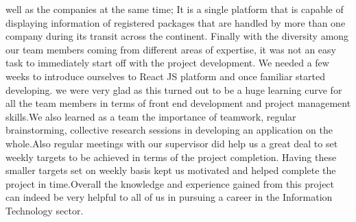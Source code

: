 well as the companies at the same time; It is a single platform that is capable of displaying information of registered packages that are handled by more than one company during its transit across the continent.
Finally with the diversity among our team members coming from different areas of expertise, it was not an easy task to immediately start off with the project development. We needed a few weeks to introduce ourselves to React JS platform and once familiar started developing. we were very glad as this turned out to be a huge learning curve for all the team members in terms of front end development and project management skills.We also learned as a team the importance of teamwork, regular brainstorming, collective research sessions in developing an application on the whole.Also regular meetings with our supervisor did help us a great deal to set weekly targets to be achieved in terms of the project completion. Having these smaller targets set on weekly basis kept us motivated and helped complete the project in time.Overall the knowledge and experience gained from this project can indeed be very helpful to all of us in pursuing a career in the Information Technology sector. 
